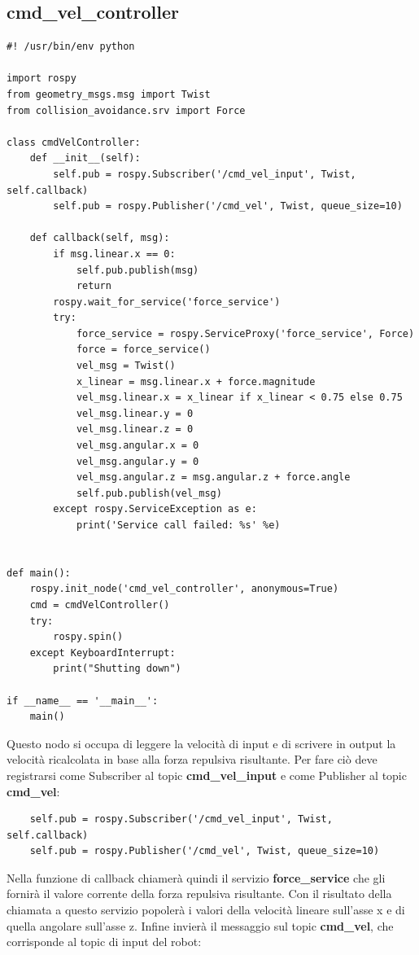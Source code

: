 \documentclass[Lau, binding=0.6cm, oneside]{sapthesis}
\begin{document}
\subsection{cmd\_vel\_controller}
\begin{lstlisting}
#! /usr/bin/env python

import rospy
from geometry_msgs.msg import Twist
from collision_avoidance.srv import Force

class cmdVelController:
    def __init__(self):
        self.pub = rospy.Subscriber('/cmd_vel_input', Twist, self.callback)
        self.pub = rospy.Publisher('/cmd_vel', Twist, queue_size=10)
    
    def callback(self, msg):
        if msg.linear.x == 0:
            self.pub.publish(msg)
            return
        rospy.wait_for_service('force_service')
        try:
            force_service = rospy.ServiceProxy('force_service', Force)
            force = force_service()
            vel_msg = Twist()
            x_linear = msg.linear.x + force.magnitude
            vel_msg.linear.x = x_linear if x_linear < 0.75 else 0.75
            vel_msg.linear.y = 0
            vel_msg.linear.z = 0
            vel_msg.angular.x = 0
            vel_msg.angular.y = 0
            vel_msg.angular.z = msg.angular.z + force.angle
            self.pub.publish(vel_msg)
        except rospy.ServiceException as e:
            print('Service call failed: %s' %e)


def main():
    rospy.init_node('cmd_vel_controller', anonymous=True)
    cmd = cmdVelController()
    try:
        rospy.spin()
    except KeyboardInterrupt:
        print("Shutting down")

if __name__ == '__main__':
    main()
\end{lstlisting}

Questo nodo si occupa di leggere la velocità di input e di scrivere in output la velocità ricalcolata in base alla forza repulsiva risultante.
Per fare ciò deve registrarsi come Subscriber al topic \textbf{cmd\_vel\_input} e come Publisher al topic \textbf{cmd\_vel}:

\begin{lstlisting}
    self.pub = rospy.Subscriber('/cmd_vel_input', Twist, self.callback)
    self.pub = rospy.Publisher('/cmd_vel', Twist, queue_size=10)
\end{lstlisting}

Nella funzione di callback chiamerà quindi il servizio \textbf{force\_service} che gli fornirà il valore corrente della forza repulsiva risultante.
Con il risultato della chiamata a questo servizio popolerà i valori della velocità lineare sull'asse x e di quella angolare sull'asse z.
Infine invierà il messaggio sul topic \textbf{cmd\_vel}, che corrisponde al topic di input del robot:
\end{document}
